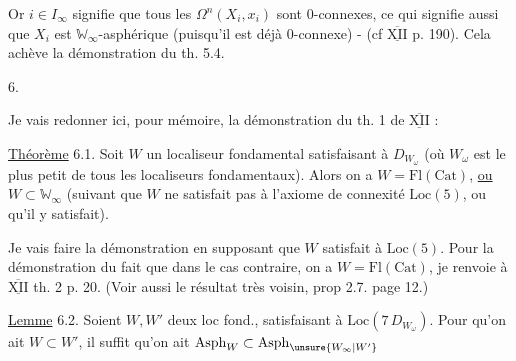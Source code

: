 Or $i\in I_\infty$ signifie que tous les $\Omega^n(X_i,x_i)$ sont $0$-connexes, ce qui signifie aussi que $X_i$ est $\mathbb W_\infty$-asphérique (puisqu'il est déjà $0$-connexe) - (cf $\overline{\underline{\mathrm{XII}}}$  p. 190). Cela achève la démonstration du th. 5.4.

6. \uline{} 

Je vais redonner ici, pour mémoire, la démonstration du th. 1 de $\overline{\underline{\mathrm{XII}}}$ :

\uline{Théorème} 6.1. Soit $W$ un localiseur fondamental satisfaisant à $D_{W_\omega}$ (où $W_\omega$ est le plus petit de tous les localiseurs fondamentaux). Alors on a $W=\mathrm{Fl}(\mathrm{Cat})$, \uline{ou} $W\subset\mathbb W_\infty$ (suivant que $W$ ne satisfait pas à l'axiome de connexité $\mathrm{Loc}(5)$, ou qu'il y satisfait).

Je vais faire la démonstration en supposant que $W$ satisfait à $\mathrm{Loc}(5)$. Pour la démonstration du fait que dans le cas contraire, on a $W=\mathrm{Fl}(\mathrm{Cat})$, je renvoie à $\overline{\underline{\mathrm{XII}}}$ th. 2 p. 20. (Voir aussi le résultat  très voisin,   prop 2.7. page 12.)

\uline{Lemme} 6.2. Soient $W,W'$ deux loc fond.,  satisfaisant à $\mathrm{Loc}(7\,D_{W_\omega})$. Pour qu'on ait $W\subset W'$, il suffit qu'on ait $\mathrm{Asph}_W\subset\mathrm{Asph}_{\unsure{W_\infty|W'}}$
